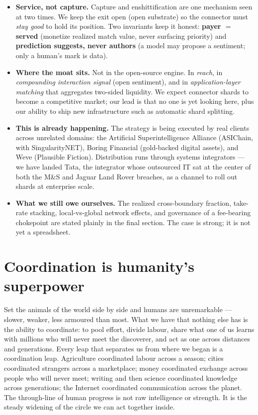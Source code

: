 \documentclass[11pt]{article}
\newcommand{\invariant}[1]{\textbf{\color{accent}#1}}
\begin{document}
\begin{keybox}
\begin{itemize}[leftmargin=1.2em, itemsep=4pt, topsep=4pt]
  \item \textbf{Service, not capture.} Capture and enshittification are one mechanism seen at two times. We keep the exit open (open substrate) so the connector must \emph{stay good} to hold its position. Two invariants keep it honest: \invariant{payer $=$ served} (monetize realized match value, never surfacing priority) and \invariant{prediction suggests, never authors} (a model may propose a sentiment; only a human's mark is data).
  \item \textbf{Where the moat sits.} Not in the open-source engine. In \emph{reach}, in \emph{compounding interaction signal} (open sentiment), and in \emph{application-layer matching} that aggregates two-sided liquidity. We expect connector shards to become a competitive market; our lead is that no one is yet looking here, plus our ability to ship new infrastructure such as automatic shard splitting.
  \item \textbf{This is already happening.} The strategy is being executed by real clients across unrelated domains: the Artificial Superintelligence Alliance (ASIChain, with SingularityNET), Boring Financial (gold-backed digital assets), and Weve (Plausible Fiction). Distribution runs through systems integrators --- we have landed Tata, the integrator whose outsourced IT sat at the center of both the M\&S and Jaguar Land Rover breaches, as a channel to roll out shards at enterprise scale.
  \item \textbf{What we still owe ourselves.} The realized cross-boundary fraction, take-rate stacking, local-vs-global network effects, and governance of a fee-bearing chokepoint are stated plainly in the final section. The case is strong; it is not yet a spreadsheet.
\end{itemize}
\end{keybox}

\section{Coordination is humanity's superpower}\label{sec:coordination}

Set the animals of the world side by side and humans are unremarkable --- slower, weaker, less armoured than most. What we have that nothing else has is the ability to coordinate: to pool effort, divide labour, share what one of us learns with millions who will never meet the discoverer, and act as one across distances and generations. Every leap that separates us from where we began is a coordination leap. Agriculture coordinated labour across a season; cities coordinated strangers across a marketplace; money coordinated exchange across people who will never meet; writing and then science coordinated knowledge across generations; the Internet coordinated communication across the planet. The through-line of human progress is not raw intelligence or strength. It is the steady widening of the circle we can act together inside.
\end{document}
